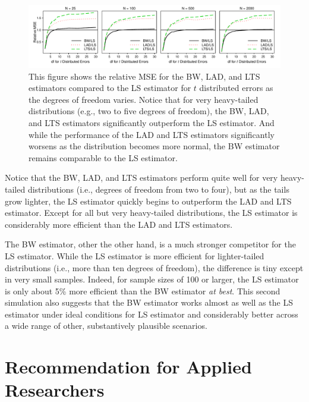 \documentclass[12pt]{article}
\begin{document}
\begin{figure}[h!]
\begin{center}
\includegraphics[width = \textwidth]{figs/mc-sims.pdf}
\caption{This figure shows the relative MSE for the BW, LAD, and LTS estimators compared to the LS estimator for $t$ distributed errors as the degrees of freedom varies. 
Notice that for very heavy-tailed distributions (e.g., two to five degrees of freedom), the BW, LAD, and LTS estimators significantly outperform the LS estimator. 
And while the performance of the LAD and LTS estimators significantly worsens as the distribution becomes more normal, the BW estimator remains comparable to the LS estimator.}\label{fig:mc-sims}
\end{center}
\end{figure}

Notice that the BW, LAD, and LTS estimators perform quite well for very heavy-tailed distributions (i.e., degrees of freedom from two to four), but as the tails grow lighter, the LS estimator quickly begins to outperform the LAD and LTS estimator. 
Except for all but very heavy-tailed distributions, the LS estimator is considerably more efficient than the LAD and LTS estimators. 

The BW estimator, other the other hand, is a much stronger competitor for the LS estimator. 
While the LS estimator is more efficient for lighter-tailed distributions (i.e., more than ten degrees of freedom), the difference is tiny except in very small samples. 
Indeed, for sample sizes of 100 or larger, the LS estimator is only about 5\% more efficient than the BW estimator \textit{at best}. 
This second simulation also suggests that the BW estimator works almost as well as the LS estimator under ideal conditions for LS estimator and considerably better across a wide range of other, substantively plausible scenarios.

\section*{Recommendation for Applied Researchers}
\end{document}
